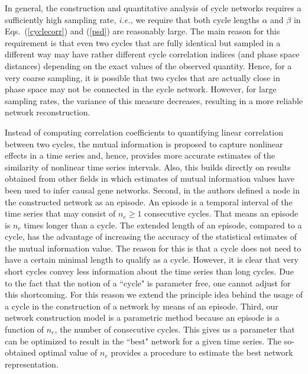 		In general, the construction and quantitative analysis of cycle networks requires a sufficiently high sampling rate, \textit{i.e.,} we require that both cycle lengths $\alpha$ and $\beta$ in Eqs.~(\ref{cyclecorr}) and (\ref{psd}) are reasonably large. The main reason for this requirement is that even two cycles that are fully identical but sampled in a different way may have rather different cycle correlation indices (and phase space distances) depending on the exact values of the observed quantity. Hence, for a very coarse sampling, it is possible that two cycles that are actually close in phase space may not be connected in the cycle network. However, for large sampling rates, the variance of this measure decreases, resulting in a more reliable network reconstruction.
		
		Instead of computing correlation coefficients to quantifying linear correlation between two cycles, the mutual information is proposed to capture nonlinear effects in a time series and, hence, provides more accurate estimates of the similarity of nonlinear time series intervals. Also, this builds directly on results obtained from other fields in which estimates of mutual information values have been used to infer causal gene networks. Second, in \cite{Emmert2011} the authors defined a node in the constructed network as an episode. An episode is a temporal interval of the time series that may consist of $n_e \ge 1$ consecutive cycles. That means an episode is $n_e$ times longer than a cycle. The extended length of an episode, compared to a cycle, has the advantage of increasing the accuracy of the statistical estimates of the mutual information value. The reason for this is that a cycle does not need to have a certain minimal length to qualify as a cycle. However, it is clear that very short cycles convey less information about the time series than long cycles. Due to the fact that the notion of a ``cycle" is parameter free, one cannot adjust for this shortcoming. For this reason we extend the principle idea behind the usage of a cycle in the construction of a network \cite{Zhang2006} by means of an episode. Third, our network construction model is a parametric method because an episode is a function of $n_e$, the number of consecutive cycles. This gives us a parameter that can be optimized to result in the ``best" network for a given time series. The so-obtained optimal value of $n_e$ provides a procedure to estimate the best network representation. 
		
